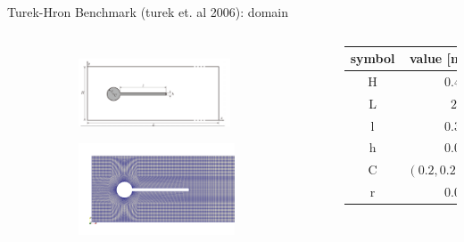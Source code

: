 \documentclass[10pt,t]{beamer}
\begin{document}
\begin{frame}{Turek-Hron  Benchmark (turek et. al 2006): domain}


\begin{columns}
    \begin{figure}[t]
    \vspace*{-1.5cm}
    \hspace*{-0.2cm}
	\centering
	  \begin{subfigure}[t]{\textwidth}
    \centering
    \includegraphics[width=0.865\textwidth, trim=0 0 50 0, clip]{images/FSI2/FSI2.png}
  \end{subfigure}
  \begin{subfigure}[t]{\textwidth}
    \hspace{3pt}
    \includegraphics[width=0.89\textwidth]{images/FSI2/FSI2-mesh.png}
  \end{subfigure}
	
	
	
	
    \end{figure}
    
    	\scriptsize
		\begin{tabular}{ c | r } 
			symbol & value [m]  \\
			\hline
			H  & $0.41$     \\
			L  & $2.5$  \\
			l  & $0.35$  \\
			h  & $0.02$  \\
			C  & $\left(0.2,0.2 \right)$  \\
			r  & $0.05$  \\
			\end{tabular}


\end{columns}
\end{frame}
\end{document}
